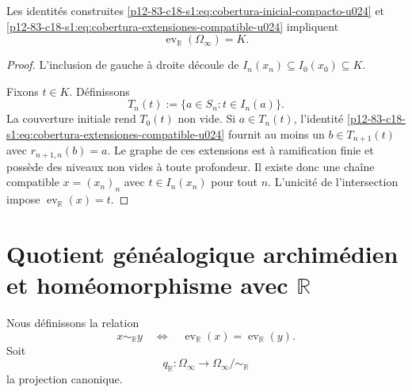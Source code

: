 \begin{theorem}
\label{p12-83-c18-s1:thm:sobreyectividad-evaluacion-compacto}
Les identités construites
\eqref{p12-83-c18-s1:eq:cobertura-inicial-compacto-u024} et
\eqref{p12-83-c18-s1:eq:cobertura-extensiones-compatible-u024} impliquent
\begin{equation}
 \operatorname{ev}_{\mathbb R}(\Omega_\infty)=K.
 \label{p12-83-c18-s1:eq:imagen-evaluacion-compacto}
\end{equation}
\end{theorem}

\begin{proof}
L'inclusion de gauche à droite découle de
\(I_n(x_n)\subseteq I_0(x_0)\subseteq K\).

Fixons \(t\in K\). Définissons
\begin{equation}
 T_n(t):=\{a\in S_n:t\in I_n(a)\}.
 \label{p12-83-c18-s1:eq:estados-que-cubren-punto}
\end{equation}
La couverture initiale rend \(T_0(t)\) non vide. Si \(a\in T_n(t)\),
l'identité \eqref{p12-83-c18-s1:eq:cobertura-extensiones-compatible-u024} fournit au
moins un \(b\in T_{n+1}(t)\) avec \(r_{n+1,n}(b)=a\). Le graphe de ces
extensions est à ramification finie et possède des niveaux non vides à toute
profondeur. Il existe donc une chaîne compatible \(x=(x_n)_n\) avec
\(t\in I_n(x_n)\) pour tout \(n\). L'unicité de l'intersection impose
\(\operatorname{ev}_{\mathbb R}(x)=t\).
\end{proof}

\section{Quotient généalogique archimédien et homéomorphisme avec \texorpdfstring{\(\mathbb R\)}{R}}

Nous définissons la relation
\begin{equation}
 x\sim_{\mathbb R}y
 \quad\Longleftrightarrow\quad
 \operatorname{ev}_{\mathbb R}(x)
 =\operatorname{ev}_{\mathbb R}(y).
 \label{p12-83-c18-s1:eq:relacion-equivalencia-arquimediana}
\end{equation}
Soit
\begin{equation}
 q_{\mathbb R}:\Omega_\infty
 \longrightarrow\Omega_\infty/\!\sim_{\mathbb R}
 \label{p12-83-c18-s1:eq:proyeccion-cociente-arquimediano}
\end{equation}
la projection canonique.

